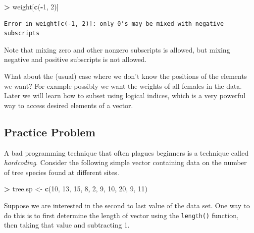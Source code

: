 \documentclass[
]{krantz}
\makeatletter
\newenvironment{Shaded}{\begin{snugshade}}{\end{snugshade}}
\newcommand{\DecValTok}[1]{\textcolor[rgb]{0.06,0.06,0.06}{#1}}
\newcommand{\KeywordTok}[1]{\textcolor[rgb]{0.27,0.27,0.27}{\textbf{#1}}}
\newcommand{\NormalTok}[1]{#1}
\newcommand{\OperatorTok}[1]{\textcolor[rgb]{0.43,0.43,0.43}{\textbf{#1}}}
\newcommand{\StringTok}[1]{\textcolor[rgb]{0.5,0.5,0.5}{#1}}
\newenvironment{kframe}{%
\medskip{}
\setlength{\fboxsep}{.8em}
 \def\at@end@of@kframe{}%
 \ifinner\ifhmode%
  \def\at@end@of@kframe{\end{minipage}}%
  \begin{minipage}{\columnwidth}%
 \fi\fi%
 \def\FrameCommand##1{\hskip\@totalleftmargin \hskip-\fboxsep
 \colorbox{shadecolor}{##1}\hskip-\fboxsep
     \hskip-\linewidth \hskip-\@totalleftmargin \hskip\columnwidth}%
 \MakeFramed {\advance\hsize-\width
   \@totalleftmargin\z@ \linewidth\hsize
   \@setminipage}}%
 {\par\unskip\endMakeFramed%
 \at@end@of@kframe}
\renewenvironment{Shaded}{\begin{kframe}}{\end{kframe}}
\makeatother
\begin{document}
\begin{Shaded}
\begin{Highlighting}[]
\OperatorTok{\textgreater{}}\StringTok{ }\NormalTok{weight[}\KeywordTok{c}\NormalTok{(}\OperatorTok{{-}}\DecValTok{1}\NormalTok{, }\DecValTok{2}\NormalTok{)]}
\end{Highlighting}
\end{Shaded}

\begin{verbatim}
Error in weight[c(-1, 2)]: only 0's may be mixed with negative subscripts
\end{verbatim}

Note that mixing zero and other nonzero subscripts is allowed, but mixing negative and positive subscripts is not allowed.

What about the (usual) case where we don't know the positions of the elements we want? For example possibly we want the weights of all females in the data. Later we will learn how to subset using logical indices, which is a very powerful way to access desired elements of a vector.

\hypertarget{practice-problem-1}{%
\subsection{Practice Problem}\label{practice-problem-1}}

A bad programming technique that often plagues beginners is a technique called \emph{hardcoding}. Consider the following simple vector containing data on the number of tree species found at different sites.

\begin{Shaded}
\begin{Highlighting}[]
\OperatorTok{\textgreater{}}\StringTok{ }\NormalTok{tree.sp \textless{}{-}}\StringTok{ }\KeywordTok{c}\NormalTok{(}\DecValTok{10}\NormalTok{, }\DecValTok{13}\NormalTok{, }\DecValTok{15}\NormalTok{, }\DecValTok{8}\NormalTok{, }\DecValTok{2}\NormalTok{, }\DecValTok{9}\NormalTok{, }\DecValTok{10}\NormalTok{, }\DecValTok{20}\NormalTok{, }\DecValTok{9}\NormalTok{, }\DecValTok{11}\NormalTok{)}
\end{Highlighting}
\end{Shaded}

Suppose we are interested in the second to last value of the data set. One way to do this is to first determine the length of vector using the \texttt{length()} function, then taking that value and subtracting 1.
\end{document}
